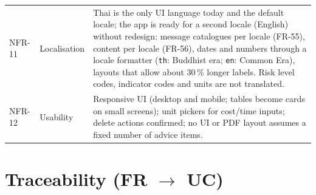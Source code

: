 \documentclass[11pt,a4paper]{article}
\begin{document}
\begin{longtable}{@{}l l R{12.2cm}@{}}
NFR-11 & Localisation & Thai is the only UI language today and the default locale; the app is ready for a second locale (English) without redesign: message catalogues per locale (FR-55), content per locale (FR-56), dates and numbers through a locale formatter (\texttt{th}: Buddhist era; \texttt{en}: Common Era), layouts that allow about 30\,\% longer labels. Risk level codes, indicator codes and units are not translated. \\
NFR-12 & Usability & Responsive UI (desktop and mobile; tables become cards on small screens); unit pickers for cost/time inputs; delete actions confirmed; no UI or PDF layout assumes a fixed number of advice items. \\
\bottomrule
\end{longtable}

\clearpage
{}\section{Traceability (FR $\to$ UC)}
\begingroup\scriptsize\setlength{\tabcolsep}{1.6pt}
\end{document}
